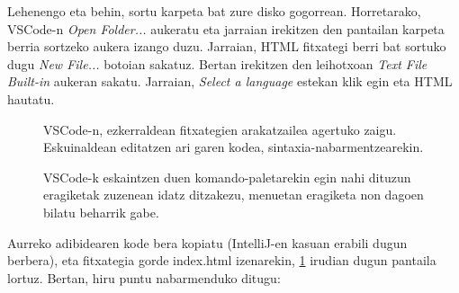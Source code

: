 Lehenengo eta behin, sortu karpeta bat zure disko gogorrean. Horretarako, \mbox{VSCode-n} \textquotedbl{}\textit{Open Folder...}\textquotedbl{} aukeratu eta jarraian irekitzen den pantailan karpeta berria sortzeko aukera izango duzu. Jarraian, HTML fitxategi berri bat sortuko dugu \textquotedbl{}\textit{New File...}\textquotedbl{} botoian sakatuz. Bertan irekitzen den leihotxoan \textquotedbl{}\textit{Text File Built-in}\textquotedbl{} aukeran sakatu. Jarraian, \textquotedbl{}\textit{Select a language}\textquotedbl{} estekan klik egin eta HTML hautatu. 

\begin{figure}[ht]
	\centering
{}
\caption{VSCode-n, ezkerraldean fitxategien arakatzailea agertuko zaigu. Eskuinaldean editatzen ari garen kodea, sintaxia-nabarmentzearekin.}
\label{fig:vscode3_1}
\end{figure}

\begin{figure}[ht]
	\centering
{}
\caption{VSCode-k eskaintzen duen komando-paletarekin egin nahi dituzun eragiketak zuzenean idatz ditzakezu, menuetan eragiketa non dagoen bilatu beharrik gabe.}
\label{fig:vscode4}
\end{figure}

Aurreko adibidearen kode bera kopiatu (IntelliJ-en kasuan erabili dugun berbera), eta fitxategia gorde index.html izenarekin, \ref{fig:vscode3_1} irudian dugun pantaila lortuz. Bertan, hiru puntu nabarmenduko ditugu:

